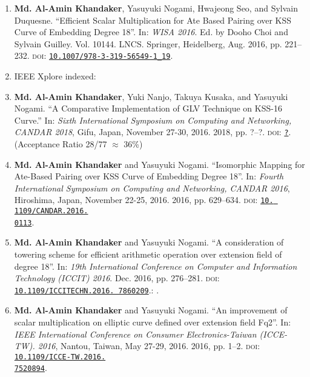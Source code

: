 \begin{enumerate}
	\item \textbf{Md. Al-Amin Khandaker}, Yasuyuki Nogami, Hwajeong Seo, and Sylvain Duquesne. ``Efficient Scalar Multiplication for Ate Based Pairing over KSS Curve of Embedding Degree 18''. In: \textit{WISA 2016}. Ed. by Dooho Choi and Sylvain Guilley. Vol. 10144. LNCS. Springer, Heidelberg, Aug. 2016, pp. 221–232. \textsc{doi}: \href{https://doi.org/10.1007/978-3-319-56549-1\_19}{\texttt{10.1007/978-3-319-56549-1\_19}}.

	\vspace{5mm}
	\item[ ] \Large IEEE Xplore indexed:
	\normalsize
	\item \textbf{Md. Al-Amin Khandaker}, Yuki Nanjo, Takuya Kusaka, and Yasuyuki Nogami. ``A Comparative Implementation of GLV Technique on KSS-16 Curve.'' In:  \textit{Sixth International Symposium on Computing and Networking, CANDAR 2018}, Gifu, Japan, November 27-30, 2016. 2018, pp. ?–?. \textsc{doi}: \href{_}{\texttt{?}}. (Acceptance Ratio 28/77 $\approx$ 36\%)
	
	\item \textbf{Md. Al-Amin Khandaker} and Yasuyuki Nogami. “Isomorphic Mapping for Ate-Based Pairing over KSS Curve of Embedding Degree 18”. In: \textit{Fourth International Symposium on Computing and Networking, CANDAR 2016}, Hiroshima, Japan, November 22-25, 2016. 2016, pp. 629–634. \textsc{doi}: \href{https://doi.org/10. 1109/CANDAR.2016.0113}{\texttt{10. 1109/CANDAR.2016.\\0113}}.
	
	\item  \textbf{Md. Al-Amin Khandaker} and Yasuyuki Nogami. ``A consideration of towering scheme for efficient arithmetic operation over extension field of degree 18''. In: \textit{19th International Conference on Computer and Information Technology (ICCIT) 2016}. Dec. 2016, pp. 276–281. \textsc{doi}: \href{https://doi.org/10.1109/ICCITECHN.2016.7860209}{\texttt{10.1109/ICCITECHN.2016. 7860209}}.: .
	
	\item \textbf{Md. Al-Amin Khandaker} and Yasuyuki Nogami. ``An improvement of scalar multiplication on elliptic curve defined over extension field Fq2''. In: \textit{IEEE International Conference on Consumer Electronics-Taiwan (ICCE- TW). 2016}, Nantou, Taiwan, May 27-29, 2016. 2016, pp. 1–2. \textsc{doi}: \href{https://doi.org/10.1109/ICCE-TW.2016.7520894}{\texttt{10.1109/ICCE-TW.2016.\\7520894}}.
	

\end{enumerate}
